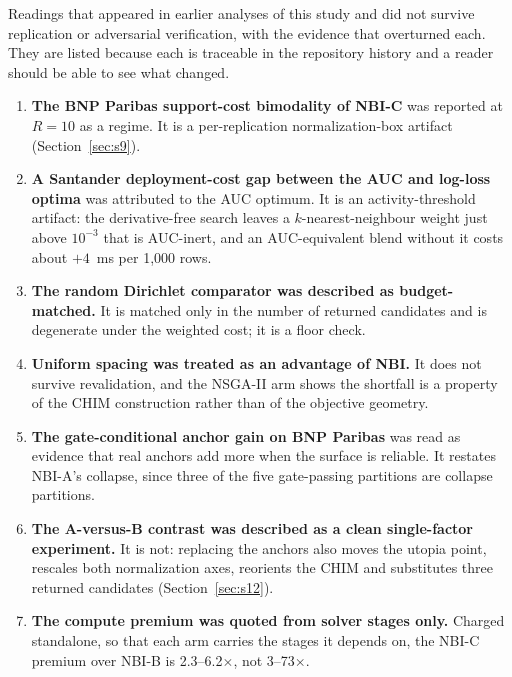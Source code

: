 \documentclass[11pt,a4paper]{article}
\begin{document}
Readings that appeared in earlier analyses of this study and did not survive replication or adversarial verification,
with the evidence that overturned each. They are listed because each is traceable in the repository history and a
reader should be able to see what changed.

\begin{enumerate}
\item \textbf{The BNP Paribas support-cost bimodality of NBI-C} was reported at $R = 10$ as a regime. It is a
per-replication normalization-box artifact (Section~\ref{sec:s9}).
\item \textbf{A Santander deployment-cost gap between the AUC and log-loss optima} was attributed to the AUC optimum.
It is an activity-threshold artifact: the derivative-free search leaves a $k$-nearest-neighbour weight just above
$10^{-3}$ that is AUC-inert, and an AUC-equivalent blend without it costs about $+4$~ms per 1{,}000 rows.
\item \textbf{The random Dirichlet comparator was described as budget-matched.} It is matched only in the number of
returned candidates and is degenerate under the weighted cost; it is a floor check.
\item \textbf{Uniform spacing was treated as an advantage of NBI.} It does not survive revalidation, and the
NSGA-II arm shows the shortfall is a property of the CHIM construction rather than of the objective geometry.
\item \textbf{The gate-conditional anchor gain on BNP Paribas} was read as evidence that real anchors add more when
the surface is reliable. It restates NBI-A's collapse, since three of the five gate-passing partitions are collapse
partitions.
\item \textbf{The A-versus-B contrast was described as a clean single-factor experiment.} It is not: replacing the
anchors also moves the utopia point, rescales both normalization axes, reorients the CHIM and substitutes three
returned candidates (Section~\ref{sec:s12}).
\item \textbf{The compute premium was quoted from solver stages only.} Charged standalone, so that each arm carries
the stages it depends on, the NBI-C premium over NBI-B is 2.3--6.2$\times$, not 3--73$\times$.
\end{enumerate}
\end{document}
